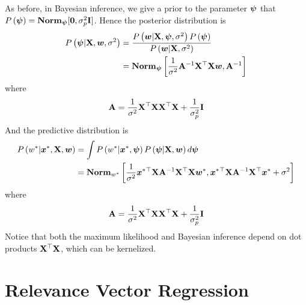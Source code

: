 As before, in Bayesian inference, we give a prior to the parameter $\boldsymbol{\psi}$ that $P\left(\boldsymbol{\psi}\right)=\mathbf{Norm}_{\boldsymbol{\psi}}[\boldsymbol{0},\sigma_p^2\mathbf{I}]$. Hence the posterior distribution is
\begin{align*}
	P\left(\boldsymbol{\psi}|\mathbf{X},\boldsymbol{w},\sigma^2\right)&=\frac{P\left(\boldsymbol{w}|\mathbf{X},\boldsymbol{\psi},\sigma^2\right)P\left(\boldsymbol{\psi}\right)}{P\left(\boldsymbol{w}|\mathbf{X},\sigma^2\right)} \\
	&=\mathbf{Norm}_{\boldsymbol{\psi}}\left[\frac{1}{\sigma^2}\mathbf{A}^{-1}\mathbf{X}^\top\mathbf{X}\boldsymbol{w},\mathbf{A}^{-1}\right]
\end{align*}
where
\begin{align*}
	\mathbf{A}=\frac{1}{\sigma^2}\mathbf{X}^\top\mathbf{X}\mathbf{X}^\top\mathbf{X}+\frac{1}{\sigma_p^2}\mathbf{I}
\end{align*}
And the predictive distribution is
\begin{align*}
	P\left(w^*|\boldsymbol{x}^*,\mathbf{X},\boldsymbol{w}\right)&=\int P\left(w^*|\boldsymbol{x}^*,\boldsymbol{\psi}\right)P\left(\boldsymbol{\psi}|\mathbf{X},\boldsymbol{w}\right)d\boldsymbol{\psi} \\
	&=\mathbf{Norm}_{w^*}\left[\frac{1}{\sigma^2}\boldsymbol{x}^*{}^\top\mathbf{X}\mathbf{A}^{-1}\mathbf{X}^\top\mathbf{X}\boldsymbol{w}^*,\boldsymbol{x}^*{}^\top\mathbf{X}\mathbf{A}^{-1}\mathbf{X}^\top\boldsymbol{x}^*+\sigma^2\right]
\end{align*}
where
\begin{align*}
\mathbf{A}=\frac{1}{\sigma^2}\mathbf{X}^\top\mathbf{X}\mathbf{X}^\top\mathbf{X}+\frac{1}{\sigma_p^2}\mathbf{I}
\end{align*}
Notice that both the maximum likelihood and Bayesian inference depend on dot products $\mathbf{X}^\top\mathbf{X}$, which can be kernelized.



\section{Relevance Vector Regression}
\label{section6.8}

